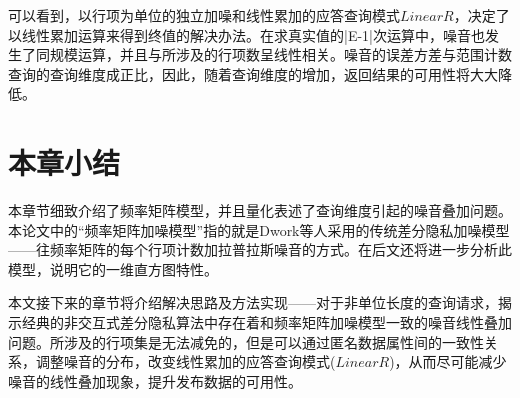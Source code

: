 可以看到，以行项为单位的独立加噪和线性累加的应答查询模式$LinearR$，决定了以线性累加运算来得到终值的解决办法。在求真实值的|E-1|次运算中，噪音也发生了同规模运算，并且与所涉及的行项数呈线性相关。噪音的误差方差与范围计数查询的查询维度成正比，因此，随着查询维度的增加，返回结果的可用性将大大降低。

\section{本章小结}

本章节细致介绍了频率矩阵模型，并且量化表述了查询维度引起的噪音叠加问题。本论文中的“频率矩阵加噪模型”指的就是Dwork等人采用的传统差分隐私加噪模型——往频率矩阵的每个行项计数加拉普拉斯噪音的方式。在后文还将进一步分析此模型，说明它的一维直方图特性。

本文接下来的章节将介绍解决思路及方法实现——对于非单位长度的查询请求，揭示经典的非交互式差分隐私算法中存在着和频率矩阵加噪模型一致的噪音线性叠加问题。所涉及的行项集是无法减免的，但是可以通过匿名数据属性间的一致性关系，调整噪音的分布，改变线性累加的应答查询模式($LinearR$)，从而尽可能减少噪音的线性叠加现象，提升发布数据的可用性。



